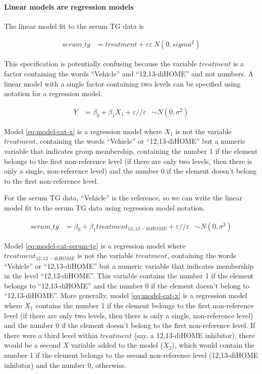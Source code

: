 \documentclass[]{book}
\let\oldparagraph\paragraph
\renewcommand{\paragraph}[1]{\oldparagraph{#1}\mbox{}}
\begin{document}
\hypertarget{linear-models-are-regression-models}{%
\paragraph{Linear models are regression models}\label{linear-models-are-regression-models}}

The linear model fit to the serum TG data is

\begin{align}
serum\_tg &= treatment + \varepsilon
\varepsilon ~ N(0, sigma^2)
\label{eq:lm-serum-tg}
\end{align}

This specification is potentially confusing because the variable \(treatment\) is a factor containing the words ``Vehicle'' and ``12,13-diHOME'' and not numbers. A linear model with a single factor containing two levels can be specified using notation for a regression model.

\begin{align}
Y &= \beta_0 + \beta_1 X_1 + \varepsilon//
\varepsilon &\sim N(0, \sigma^2)
\label{eq:model-cat-x}
\end{align}

Model \eqref{eq:model-cat-x} is a regression model where \(X_1\) is not the variable \(treatment\), containing the words ``Vehicle'' or ``12,13-diHOME'' but a numeric variable that indicates group membership, containing the number 1 if the element belongs to the first non-reference level (if there are only two levels, then there is only a single, non-reference level) and the number 0 if the element doesn't belong to the first non-reference level.

For the serum TG data, ``Vehicle'' is the reference, so we can write the linear model fit to the serum TG data using regression model notation.

\begin{align}
serum\_tg &= \beta_0 + \beta_1 treatment_{12,13-diHOME} + \varepsilon//
\varepsilon &\sim N(0, \sigma^2)
\label{eq:model-cat-serum-tg}
\end{align}

Model \eqref{eq:model-cat-serum-tg} is a regression model where \(treatment_{12,13-diHOME}\) is not the variable \(treatment\), containing the words ``Vehicle'' or ``12,13-diHOME'' but a numeric variable that indicates membership in the level ``12,13-diHOME''. This variable contains the number 1 if the element belongs to ``12,13-diHOME'' and the number 0 if the element doesn't belong to ``12,13-diHOME''. More generally, model \eqref{eq:model-cat-x} is a regression model where \(X_1\) contains the number 1 if the element belongs to the first non-reference level (if there are only two levels, then there is only a single, non-reference level) and the number 0 if the element doesn't belong to the first non-reference level. If there were a third level within \(treatment\) (say, a 12,13-diHOME inhibitor), there would be a second \(X\) variable added to the model (\(X_2\)), which would contain the number 1 if the element belongs to the second non-reference level (12,13-diHOME inhibitor) and the number 0, otherwise.
\end{document}
